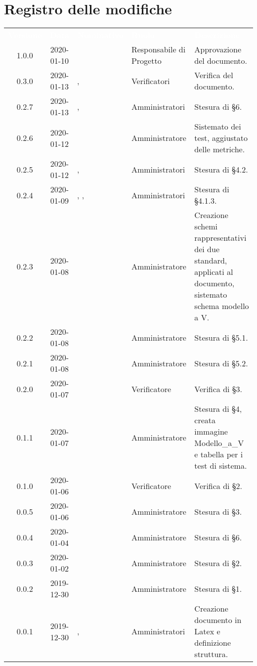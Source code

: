\section*{Registro delle modifiche}
\setcounter{table}{-1}
{
\renewcommand{\arraystretch}{1.5}
\centering
\begin{longtable}{ c c  C{4cm}  C{3cm} C{4cm}}
\textcolor{white}{\textbf{Versione}} & \textcolor{white}{\textbf{Data}} & \textcolor{white}{\textbf{Nominativo}} & \textcolor{white}{\textbf{Ruolo}} & \textcolor{white}{\textbf{Descrizione}}\\	

1.0.0 & 2020-01-10 & \SE{} & Responsabile di Progetto & Approvazione del documento. \\
0.3.0 & 2020-01-13 & \LD{}, \DF{} & Verificatori & Verifica del documento. \\

0.2.7 & 2020-01-13 & \MC{}, \AT{} & Amministratori & Stesura di §6. \\
0.2.6 & 2020-01-12 & \AT{} & Amministratore & Sistemato dei test, aggiustato delle metriche. \\
0.2.5 & 2020-01-12 & \MC{}, \BR{} & Amministratori & Stesura di §4.2. \\
0.2.4 & 2020-01-09 & \MC{}, \AT{}, \BR{} & Amministratori & Stesura di §4.1.3. \\
0.2.3 & 2020-01-08 & \AT{} & Amministratore & Creazione schemi rappresentativi dei due standard, applicati al documento, sistemato schema modello a V. \\
0.2.2 & 2020-01-08 & \MC{} & Amministratore & Stesura di §5.1. \\
0.2.1 & 2020-01-08 & \AT{} & Amministratore & Stesura di §5.2. \\
0.2.0 & 2020-01-07 & \DF{} & Verificatore & Verifica di §3. \\
0.1.1 & 2020-01-07 & \AT{} & Amministratore & Stesura di §4, creata immagine Modello\_a\_V e tabella per i test di sistema. \\
0.1.0 & 2020-01-06 & \LD{} & Verificatore & Verifica di §2. \\
0.0.5 & 2020-01-06 & \BR{} & Amministratore & Stesura di §3. \\
0.0.4 & 2020-01-04 & \MC{} & Amministratore & Stesura di §6. \\
0.0.3 & 2020-01-02 & \MC{} & Amministratore & Stesura di §2. \\
0.0.2 & 2019-12-30 & \AT{} & Amministratore & Stesura di §1. \\
0.0.1 & 2019-12-30 & \AT{}, \MC{} & Amministratori & Creazione documento in Latex e definizione struttura. \\	
		
\end{longtable}
}

